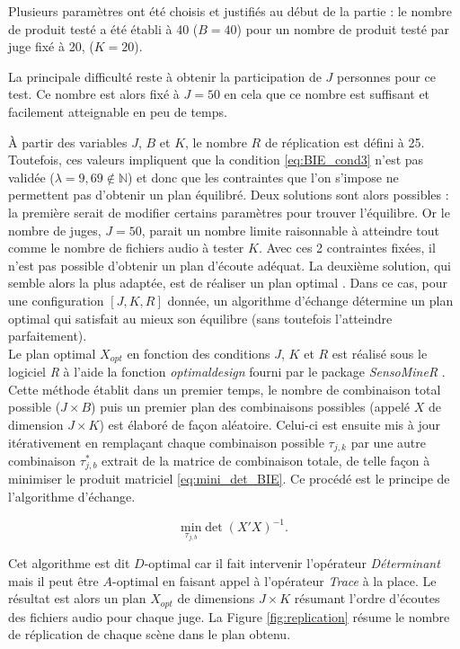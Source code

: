 Plusieurs paramètres ont été choisis et justifiés au début de la partie : le nombre de produit testé a été établi à 40 ($B = 40$) pour un nombre de produit testé par juge fixé à 20, ($K = 20$). 

La principale difficulté reste à obtenir la participation de $J$ personnes pour ce test. Ce nombre est alors fixé à $J = 50$ en cela que ce nombre est suffisant et facilement atteignable en peu de temps.

À partir des variables $J$, $B$ et $K$, le nombre $R$ de réplication est défini à 25. Toutefois, ces valeurs impliquent que la condition \ref{eq:BIE_cond3} n'est pas validée ($\lambda = 9,69 \notin \mathbb{N}$) et donc que les contraintes que l'on s'impose ne permettent pas d'obtenir un plan équilibré. Deux solutions sont alors possibles : la première serait de modifier certains paramètres pour trouver l'équilibre. Or le nombre de juges, $J = 50$, parait un nombre limite raisonnable à atteindre tout comme le nombre de fichiers audio à tester $K$. Avec ces 2 contraintes fixées, il n'est pas possible d'obtenir un plan d'écoute adéquat. La deuxième solution, qui semble alors la plus adaptée, est de réaliser un plan optimal \cite{pages_blocs_2007}. Dans ce cas, pour une configuration $\left[J, K, R\right]$ donnée, un algorithme d'échange détermine un \og plan optimal \fg{} qui satisfait au mieux son équilibre (sans toutefois l'atteindre parfaitement).\\

Le plan optimal $X_{opt}$ en fonction des conditions $J$, $K$ et $R$ est réalisé sous le logiciel \textit{R} à l'aide la fonction \textit{optimaldesign} fourni par le package \textit{SensoMineR} \cite{le_sensominer:_2008}.
Cette méthode établit dans un premier temps, le nombre de combinaison total possible ($J \times B$) puis un premier plan des combinaisons possibles (appelé $X$ de dimension $J \times K$) est élaboré de façon aléatoire. Celui-ci est ensuite mis à jour itérativement en remplaçant chaque combinaison possible $\tau_{j,k}$ par une autre combinaison $\tau^{*}_{j,b}$ extrait de la matrice de combinaison totale, de telle façon à minimiser le produit matriciel \ref{eq:mini_det_BIE}. Ce procédé est le principe de l'algorithme d'échange.

\begin{equation}\label{eq:mini_det_BIE}
\underset{\tau_{j,b}}{\text{min}} \det(X'X)^{-1}.
\end{equation}

Cet algorithme est dit $D$-optimal car il fait intervenir l'opérateur \textit{Déterminant} mais il peut être $A$-optimal en faisant appel à l'opérateur \textit{Trace} à la place. Le résultat est alors un plan $X_{opt}$ de dimensions $J \times K$ résumant l'ordre d'écoutes des fichiers audio pour chaque juge. La Figure \ref{fig:replication} résume le nombre de réplication de chaque scène dans le plan obtenu.\\

